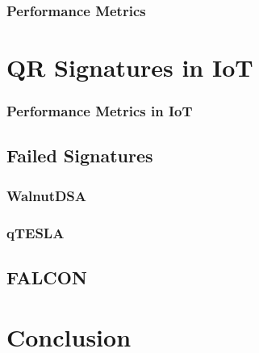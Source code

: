 \documentclass[conference]{IEEEtran}
\begin{document}
\subsubsection{Performance Metrics}

\section{QR Signatures in IoT}
\subsubsection{Performance Metrics in IoT}
\subsection{Failed Signatures}
\subsubsection{WalnutDSA}
\subsubsection{qTESLA}
\subsection{FALCON}

\section{Conclusion}




\end{document}
